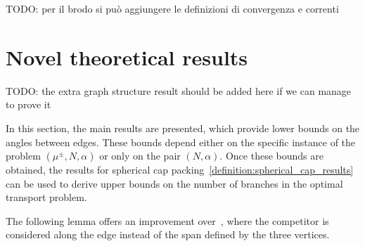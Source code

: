 \documentclass[12pt,a4paper]{article}
\numberwithin{equation}{section}
\theoremstyle{mytheorem}
\theoremstyle{myremark}
\theoremstyle{myparagraph}
\begin{document}
    TODO: per il brodo si può aggiungere le definizioni di convergenza e correnti
    
    \section{Novel theoretical results}

    TODO: the extra graph structure result should be added here if we can manage to prove it

    In this section, the main results are presented, which provide lower bounds on the angles between edges.
    These bounds depend either on the specific instance of the problem $(\mu^{\pm}, N, \alpha)$ or only on the pair $(N, \alpha)$.
    Once these bounds are obtained, the results for spherical cap packing~\ref{definition:spherical_cap_results}
    can be used to derive upper bounds on the number of branches in the optimal transport problem.

    The following lemma offers an improvement over~\cite[Lemma 12.16]{Bernot},
    where the competitor is considered along the edge instead of the span defined by the three vertices.
\end{document}
